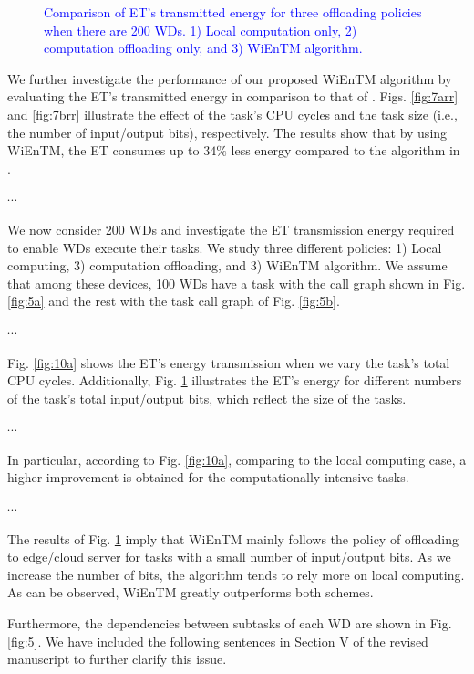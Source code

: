 \documentclass[12pt,draftclsnofoot,onecolumn]{IEEEtran}
\newcommand{\rev}[1]{{\color{blue}#1}} %
\newcommand{\rev}[1]{#1}
\newenvironment{my}[2]%
{\begin{list}{}%
{\setlength{\rightmargin}{#1}\setlength{\leftmargin}{#2}}%


 \item[]{}

} {\end{list}}
\begin{document}
\begin{enumerate}
\begin{figure}
\begin{subfigure}[b]{.24\textwidth}
		\caption{} \label{fig:10b}
	\end{subfigure}
	
	\caption{\textcolor{blue}{Comparison of ET's transmitted energy for three offloading policies when there are 200 WDs. 1) Local computation only, 2) computation offloading only, and 3) WiEnTM algorithm.}} \label{fig:10}
\end{figure}

\begin{my}{1cm}{1cm}
	\rev{
	We further investigate the performance of our proposed WiEnTM algorithm by evaluating the ET's transmitted energy in comparison to that of \cite{b13}. Figs. \ref{fig:7arr} and \ref{fig:7brr} illustrate the effect of the task's CPU cycles and the task size (i.e., the number of input/output bits), respectively. The results show that by using WiEnTM, the ET consumes up to $34\%$ less energy compared to the algorithm in \cite{b13}.
	
	$\cdots$
		
	We now consider 200 WDs and investigate the ET transmission energy required to enable WDs execute their tasks. We study three different policies: 1) Local computing, 3) computation offloading, and 3) WiEnTM algorithm. We assume that among these devices, 100 WDs have a task with the call graph shown in Fig. \ref{fig:5a} and the rest with the task call graph of Fig. \ref{fig:5b}.
		
		$\cdots$
		
	Fig. \ref{fig:10a} shows the ET's energy transmission when we vary the task's total CPU cycles. Additionally, Fig. \ref{fig:10b} illustrates the ET's energy for different numbers of the task's total  input/output bits, which reflect the size of the tasks.
	
		$\cdots$
	
	In particular, according to Fig. \ref{fig:10a}, comparing to the local computing case, a higher improvement is obtained for the computationally intensive tasks.
	
		$\cdots$
		
	The results of Fig. \ref{fig:10b} imply that WiEnTM mainly follows the policy of offloading to edge/cloud server for tasks with a small number of input/output bits. As we increase the number of bits, the algorithm tends to rely more on local computing. As can be observed, WiEnTM greatly outperforms both schemes.
	}\newline
\end{my}

Furthermore, the dependencies between subtasks of each WD are shown in Fig. \ref{fig:5}. We have included the following sentences in Section V of the revised manuscript to further clarify this issue.\newline


\end{enumerate}
\end{document}
